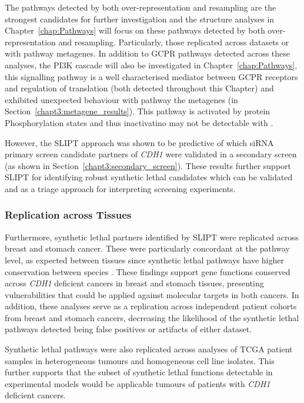 The pathways detected by both over-represent\-ation and resampling are the strongest candidates for further investigation and the  structure analyses in Chapter~\ref{chap:Pathways} will focus on these pathways detected by both over-representation and resampling. Particularly, those replicated across datasets or with pathway \glspl{metagene}. In addition to GCPR pathways detected across these analyses, the \gls{PI3K} cascade will also be investigated in Chapter~\ref{chap:Pathways}, this signalling pathway is a well characterised mediator between GCPR receptors and regulation of translation \citep{Gao2015} (both detected throughout this Chapter) and exhibited unexpected behaviour with pathway the \glspl{metagene} (in Section~\ref{chapt3:metagene_results}). This pathway is activated by protein Phosphorylation states and thus inactivatino may not be detectable with .

However, the \gls{SLIPT} approach was shown to be predictive of which \gls{siRNA} primary screen candidate partners of \textit{CDH1} were validated in a secondary screen (as shown in Section~\ref{chapt3:secondary_screen}). These results further support \gls{SLIPT} for identifying robust \gls{synthetic lethal} candidates which can be validated and as a triage approach for interpreting screening experiments.

\subsubsection{Replication across Tissues}

Furthermore, \gls{synthetic lethal} partners identified by \gls{SLIPT} were replicated across breast and stomach cancer. These were particularly concordant at the pathway level, as expected between tissues since \gls{synthetic lethal} pathways have higher conservation between species \citep{Dixon2008}. These findings support gene functions conserved across \textit{CDH1} deficient cancers in breast and stomach tissues, presenting vulnerabilities that could be applied against molecular targets in both cancers. In addition, these analyses serve as a replication across independent patient cohorts from breast and stomach cancers, decreasing the likelihood of the \gls{synthetic lethal} pathways detected being false positives or artifacts of either dataset.

Synthetic lethal pathways were also replicated across  analyses of \gls{TCGA} patient samples in heterogeneous tumours and homogeneous cell line isolates. This further supports that the subset of \gls{synthetic lethal} functions detectable in experimental models \citep{Chen2014, Telford2015} would be applicable tumours of patients with \textit{CDH1} deficient cancers.

